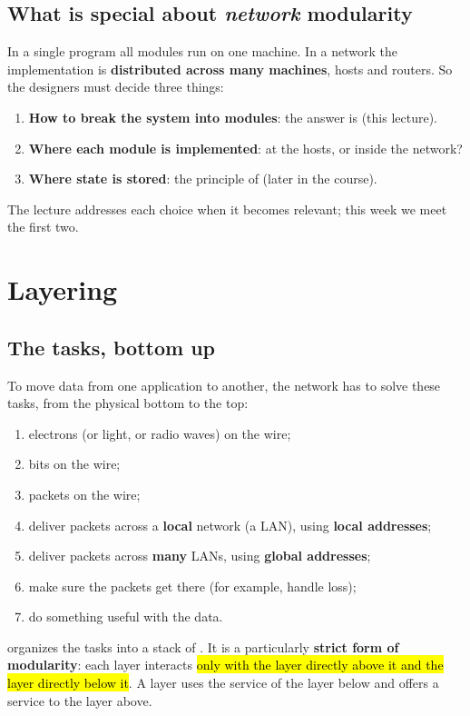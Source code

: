 \subsection{What is special about \emph{network} modularity}

In a single program all modules run on one machine. In a network the implementation is \textbf{distributed across many machines}, hosts and routers.
So the designers must decide three things:
\begin{enumerate}
  \item \textbf{How to break the system into modules}: the answer is  (this lecture).
  \item \textbf{Where each module is implemented}: at the hosts, or inside the network?
  \item \textbf{Where state is stored}: the principle of  (later in the course).
\end{enumerate}
The lecture addresses each choice when it becomes relevant; this week we meet the first two.

\section{Layering}

\subsection{The tasks, bottom up}

To move data from one application to another, the network has to solve these tasks, from the physical bottom to the top:
\begin{enumerate}
  \item electrons (or light, or radio waves) on the wire;
  \item bits on the wire;
  \item packets on the wire;
  \item deliver packets across a \textbf{local} network (a LAN), using \textbf{local addresses};
  \item deliver packets across \textbf{many} LANs, using \textbf{global addresses};
  \item make sure the packets get there (for example, handle loss);
  \item do something useful with the data.
\end{enumerate}

\begin{defn}[Layering]
 organizes the tasks into a stack of . It is a particularly \textbf{strict form of modularity}:
each layer interacts \hl{only with the layer directly above it and the layer directly below it}. A layer uses the service of the layer below and
offers a service to the layer above.
\end{defn}

